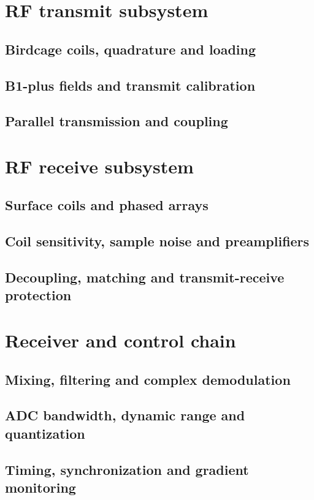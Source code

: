 \section{RF transmit subsystem}
\label{sec:17:rf-transmit-subsystem}
\subsection{Birdcage coils, quadrature and loading}
\subsection{B1-plus fields and transmit calibration}
\subsection{Parallel transmission and coupling}

\section{RF receive subsystem}
\label{sec:17:rf-receive-subsystem}
\subsection{Surface coils and phased arrays}
\subsection{Coil sensitivity, sample noise and preamplifiers}
\subsection{Decoupling, matching and transmit-receive protection}

\section{Receiver and control chain}
\label{sec:17:receiver-and-control-chain}
\subsection{Mixing, filtering and complex demodulation}
\subsection{ADC bandwidth, dynamic range and quantization}
\subsection{Timing, synchronization and gradient monitoring}

